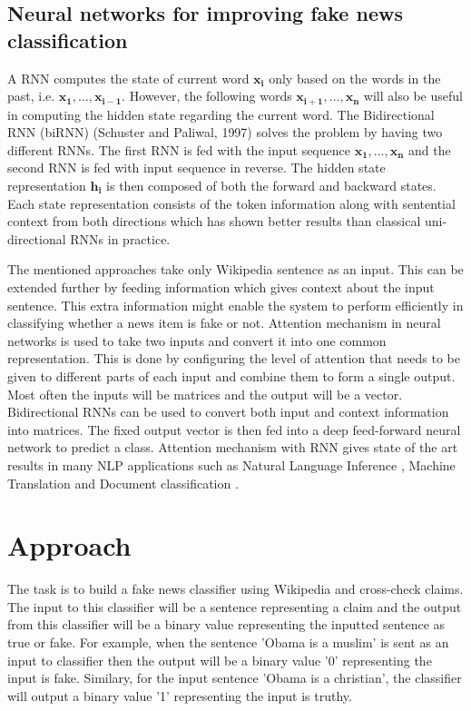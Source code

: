 \documentclass[a4paper, 11pt]{article}
\begin{document}
\subsection{Neural networks for improving fake news classification }

A RNN computes the state of current word $\mathbf{x_{i}}$ only based on the words in the past, i.e. $\mathrm{\mathbf{x_1},\dots,\mathbf{x_{i-1}}}$. However, the following words $\mathrm{\mathbf{x_{i+1}},\dots,\mathbf{x_{n}}}$ will also be useful in computing the hidden state regarding the current word. The Bidirectional RNN (biRNN) (Schuster and Paliwal, 1997) solves the problem by having two different RNNs. The first RNN is fed with the input sequence $\mathrm{\mathbf{x_{1}},\dots,\mathbf{x_{n}}}$ and the second RNN is fed with input sequence in reverse. The hidden state representation $\mathbf{h_{i}}$ is then composed of both the forward and backward states. Each state representation consists of the token information along with sentential context from both directions which has shown better results than classical uni-directional RNNs in practice.

The mentioned approaches take only Wikipedia sentence as an input. This can be extended further by feeding information which gives context about the input sentence. This extra information might enable the system to perform efficiently in classifying whether a news item is fake or not. Attention mechanism in neural networks is used to take two inputs and convert it into one common representation. This is done by configuring the level of attention that needs to be given to different parts of each input and combine them to form a single output. Most often the inputs will be matrices and the output will be a vector. Bidirectional RNNs can be used to convert both input and context information into matrices. The fixed output vector is then fed into a deep feed-forward neural network to predict a class. Attention mechanism with RNN gives state of the art results in many NLP applications such as Natural Language Inference \parencite{Parikh2016}, Machine Translation \parencite{Bahdanau2014} and Document classification \parencite{Yang2016}.

\section{Approach}  

The task is to build a fake news classifier using Wikipedia and cross-check claims. The input to this classifier will be a sentence representing a claim and the output from this classifier will be a binary value representing the inputted sentence as true or fake. For example, when the sentence 'Obama is a muslim' is sent as an input to classifier then the output will be a binary value '0' representing the input is fake. Similary, for the input sentence 'Obama is a christian', the classifier will output a binary value '1' representing the input is truthy. 
\end{document}
